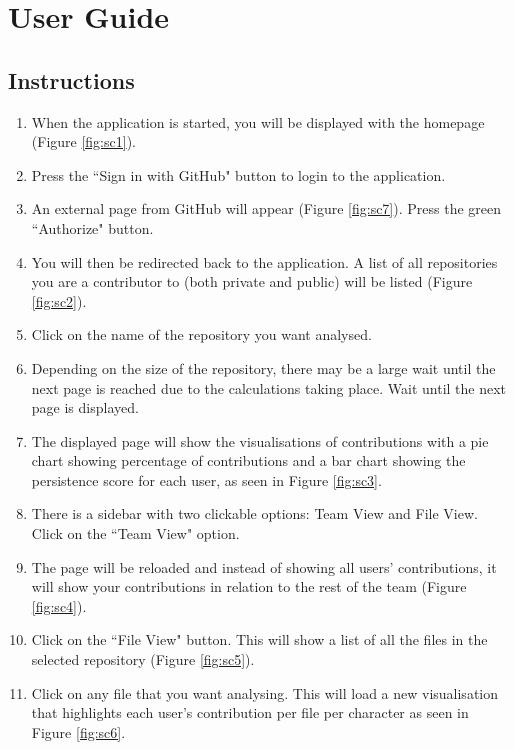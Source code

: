 \chapter{User Guide}
\section{Instructions}
\begin{enumerate}
    \item When the application is started, you will be displayed with the homepage (Figure \ref{fig:sc1}).
    \item Press the ``Sign in with GitHub" button to login to the application.
    \item An external page from GitHub will appear (Figure \ref{fig:sc7}). Press the green ``Authorize" button.
    \item You will then be redirected back to the application. A list of all repositories you are a contributor to (both private and public) will be listed (Figure \ref{fig:sc2}).
    \item Click on the name of the repository you want analysed. 
    \item Depending on the size of the repository, there may be a large wait until the next page is reached due to the calculations taking place. Wait until the next page is displayed.
    \item The displayed page will show the visualisations of contributions with a pie chart showing percentage of contributions and a bar chart showing the persistence score for each user, as seen in Figure \ref{fig:sc3}.
    \item There is a sidebar with two clickable options: Team View and File View. Click on the ``Team View" option.
    \item The page will be reloaded and instead of showing all users' contributions, it will show your contributions in relation to the rest of the team (Figure \ref{fig:sc4}).
    \item Click on the ``File View" button. This will show a list of all the files in the selected repository (Figure \ref{fig:sc5}).
    \item Click on any file that you want analysing. This will load a new visualisation that highlights each user's contribution per file per character as seen in Figure \ref{fig:sc6}.
\end{enumerate}

